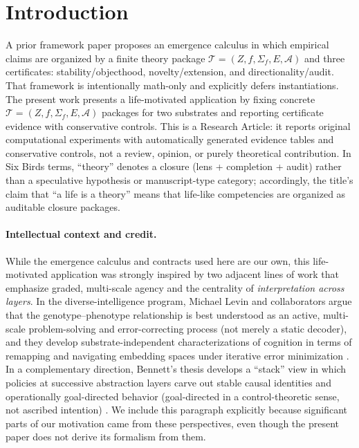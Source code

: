\documentclass[11pt]{article}
\newcommand{\Tpkg}{\mathcal T}
\newcommand{\Audit}{\mathcal A}
\newcommand{\Sig}{\Sigma}
\begin{document}
\section{Introduction}\label{sec:intro}
A prior framework paper \citep{tsiokos2026sixbirds} proposes an emergence calculus in which empirical claims are organized by a finite theory package $\Tpkg=(Z,f,\Sig_f,E,\Audit)$ and three certificates: stability/objecthood, novelty/extension, and directionality/audit. That framework is intentionally math-only and explicitly defers instantiations. The present work presents a life-motivated application by fixing concrete $\Tpkg=(Z,f,\Sig_f,E,\Audit)$ packages for two substrates and reporting certificate evidence with conservative controls. This is a Research Article: it reports original computational experiments with automatically generated evidence tables and conservative controls, not a review, opinion, or purely theoretical contribution. In Six Birds terms, ``theory'' denotes a closure (lens + completion + audit) rather than a speculative hypothesis or manuscript-type category; accordingly, the title's claim that ``a life is a theory'' means that life-like competencies are organized as auditable closure packages.

\paragraph{Intellectual context and credit.}
While the emergence calculus and contracts used here are our own, this life-motivated application was strongly inspired by two adjacent lines of work that emphasize graded, multi-scale agency and the centrality of \emph{interpretation across layers}.
In the diverse-intelligence program, Michael Levin and collaborators argue that the genotype--phenotype relationship is best understood as an active, multi-scale problem-solving and error-correcting process (not merely a static decoder), and they develop substrate-independent characterizations of cognition in terms of remapping and navigating embedding spaces under iterative error minimization \citep{hartl2025evolutionmake,hartl2026remapping}.
In a complementary direction, Bennett's thesis develops a ``stack'' view in which policies at successive abstraction layers carve out stable causal identities and operationally goal-directed behavior (goal-directed in a control-theoretic sense, not ascribed intention) \citep{bennett2025consciousmachines}.
We include this paragraph explicitly because significant parts of our motivation came from these perspectives, even though the present paper does not derive its formalism from them.
\end{document}
